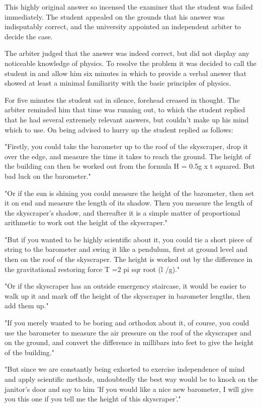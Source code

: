 This highly original answer so incensed the examiner that the student was failed immediately. The student appealed on the grounds that his answer was indisputably correct, and the university appointed an independent arbiter to decide the case. 

The arbiter judged that the answer was indeed correct, but did not display any noticeable knowledge of physics. To resolve the problem it was decided to call the student in and allow him six minutes in which to provide a verbal answer that showed at least a minimal familiarity with the basic principles of physics. 

For five minutes the student sat in silence, forehead creased in thought. The arbiter reminded him that time was running out, to which the student replied that he had several extremely relevant answers, but couldn't make up his mind which to use. On being advised to hurry up the student replied as follows: 

"Firstly, you could take the barometer up to the roof of the skyscraper, drop it over the edge, and measure the time it takes to reach the ground. The height of the building can then be worked out from the formula H = 0.5g x t squared. But bad luck on the barometer." 

"Or if the sun is shining you could measure the height of the barometer, then set it on end and measure the length of its shadow. Then you measure the length of the skyscraper's shadow, and thereafter it is a simple matter of proportional arithmetic to work out the height of the skyscraper." 

"But if you wanted to be highly scientific about it, you could tie a short piece of string to the barometer and swing it like a pendulum, first at ground level and then on the roof of the skyscraper. The height is worked out by the difference in the gravitational restoring force T =2 pi sqr root (l /g)." 

"Or if the skyscraper has an outside emergency staircase, it would be easier to walk up it and mark off the height of the skyscraper in barometer lengths, then add them up." 

"If you merely wanted to be boring and orthodox about it, of course, you could use the barometer to measure the air pressure on the roof of the skyscraper and on the ground, and convert the difference in millibars into feet to give the height of the building." 

"But since we are constantly being exhorted to exercise independence of mind and apply scientific methods, undoubtedly the best way would be to knock on the janitor's door and say to him 'If you would like a nice new barometer, I will give you this one if you tell me the height of this skyscraper'." 

